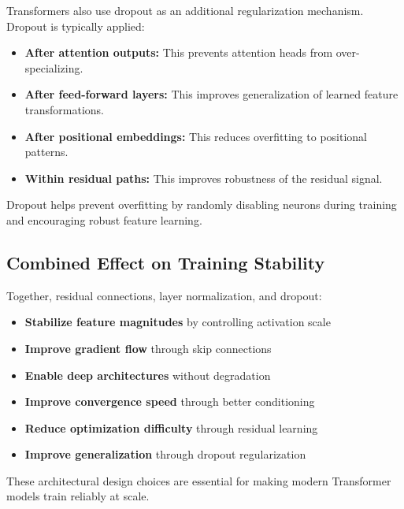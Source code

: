 \documentclass[11pt]{article}
\begin{document}
Transformers also use dropout as an additional regularization mechanism. Dropout is typically applied:

\begin{itemize}

\item \textbf{After attention outputs:}  
This prevents attention heads from over-specializing.

\item \textbf{After feed-forward layers:}  
This improves generalization of learned feature transformations.

\item \textbf{After positional embeddings:}  
This reduces overfitting to positional patterns.

\item \textbf{Within residual paths:}  
This improves robustness of the residual signal.

\end{itemize}

Dropout helps prevent overfitting by randomly disabling neurons during training and encouraging robust feature learning.

\subsection{Combined Effect on Training Stability}

Together, residual connections, layer normalization, and dropout:

\begin{itemize}

\item \textbf{Stabilize feature magnitudes} by controlling activation scale
\item \textbf{Improve gradient flow} through skip connections
\item \textbf{Enable deep architectures} without degradation
\item \textbf{Improve convergence speed} through better conditioning
\item \textbf{Reduce optimization difficulty} through residual learning
\item \textbf{Improve generalization} through dropout regularization

\end{itemize}

These architectural design choices are essential for making modern Transformer models train reliably at scale.
\end{document}
